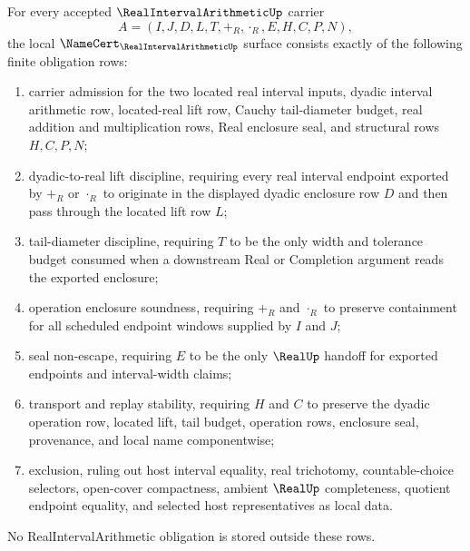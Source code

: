 \begin{theorem}
\label{thm:real-interval-arithmetic-namecert-obligations}
For every accepted $\RealIntervalArithmeticUp$ carrier
$$
A=(I,J,D,L,T,+_R,\cdot_R,E,H,C,P,N),
$$
the local $\NameCert_{\RealIntervalArithmeticUp}$ surface consists exactly of the following finite obligation rows:
\begin{enumerate}
\item carrier admission for the two located real interval inputs, dyadic interval arithmetic row, located-real lift row, Cauchy tail-diameter budget, real addition and multiplication rows, Real enclosure seal, and structural rows $H,C,P,N$;
\item dyadic-to-real lift discipline, requiring every real interval endpoint exported by $+_R$ or $\cdot_R$ to originate in the displayed dyadic enclosure row $D$ and then pass through the located lift row $L$;
\item tail-diameter discipline, requiring $T$ to be the only width and tolerance budget consumed when a downstream Real or Completion argument reads the exported enclosure;
\item operation enclosure soundness, requiring $+_R$ and $\cdot_R$ to preserve containment for all scheduled endpoint windows supplied by $I$ and $J$;
\item seal non-escape, requiring $E$ to be the only $\RealUp$ handoff for exported endpoints and interval-width claims;
\item transport and replay stability, requiring $H$ and $C$ to preserve the dyadic operation row, located lift, tail budget, operation rows, enclosure seal, provenance, and local name componentwise;
\item exclusion, ruling out host interval equality, real trichotomy, countable-choice selectors, open-cover compactness, ambient $\RealUp$ completeness, quotient endpoint equality, and selected host representatives as local data.
\end{enumerate}
No RealIntervalArithmetic obligation is stored outside these rows.
\end{theorem}
